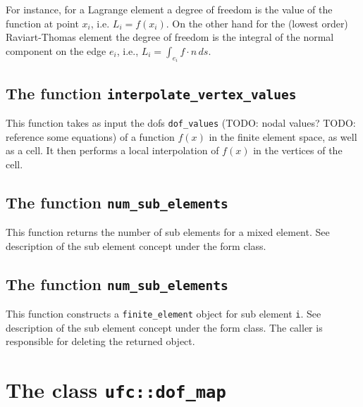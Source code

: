 For instance, for a Lagrange element a degree of
freedom is the value of the function at point $x_i$, i.e. $L_i = f(x_i)$. 
On the other hand for the (lowest order) Raviart-Thomas element 
the degree of freedom is the integral of the normal component
on the edge $e_i$, i.e., $L_i = \int_{e_i} f\cdot n \, ds$.  


\subsection{The function \texttt{interpolate\_vertex\_values}}
This function takes as input the dofs \texttt{dof\_values} (TODO: nodal values? TODO: reference some equations)
of a function $f(x)$ in the finite element space, as well as a cell.
It then performs a local interpolation of $f(x)$ in the vertices of the cell.


\subsection{The function \texttt{num\_sub\_elements}}
This function returns the number of sub elements for a mixed element.
See description of the sub element concept under the form class.


\subsection{The function \texttt{num\_sub\_elements}}
This function constructs a \texttt{finite\_element} object for sub element \texttt{i}.
See description of the sub element concept under the form class.
The caller is responsible for deleting the returned object.




\section{The class \texttt{ufc::dof\_map}}

